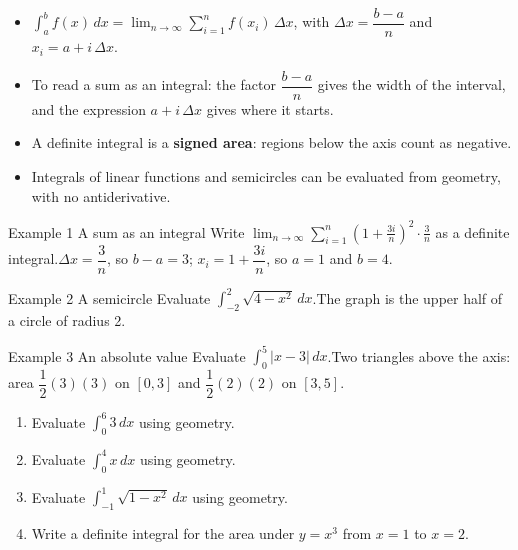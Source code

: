 \documentclass[11pt]{article}
\begin{document}

\begin{ideabox}
\begin{itemize}[leftmargin=*,itemsep=2pt,topsep=2pt]
  \item $\displaystyle\int_{a}^{b}f(x)\,dx=\displaystyle\lim_{n\to\infty}\sum_{i=1}^{n}f(x_i)\,\Delta x$, with $\Delta x=\dfrac{b-a}{n}$ and $x_i=a+i\,\Delta x$.
  \item To read a sum as an integral: the factor $\dfrac{b-a}{n}$ gives the width of the interval, and the expression $a+i\,\Delta x$ gives where it starts.
  \item A definite integral is a \textbf{signed area}: regions below the axis count as negative.
  \item Integrals of linear functions and semicircles can be evaluated from geometry, with no antiderivative.
\end{itemize}
\end{ideabox}

\begin{example}{Example 1 \textperiodcentered{} A sum as an integral}
Write $\displaystyle\lim_{n\to\infty}\sum_{i=1}^{n}\left(1+\frac{3i}{n}\right)^2\cdot\frac{3}{n}$ as a definite integral.\soln $\Delta x=\dfrac3n$, so $b-a=3$; $x_i=1+\dfrac{3i}{n}$, so $a=1$ and $b=4$.
\end{example}

\begin{example}{Example 2 \textperiodcentered{} A semicircle}
Evaluate $\displaystyle\int_{-2}^{2}\sqrt{4-x^2}\,dx$.\soln The graph is the upper half of a circle of radius 2.
\end{example}

\begin{example}{Example 3 \textperiodcentered{} An absolute value}
Evaluate $\displaystyle\int_{0}^{5}|x-3|\,dx$.\soln Two triangles above the axis: area $\dfrac12(3)(3)$ on $[0,3]$ and $\dfrac12(2)(2)$ on $[3,5]$.
\end{example}

\newpage
{}

\begin{enumerate}[leftmargin=*,itemsep=2pt]
  \item Evaluate $\displaystyle\int_{0}^{6}3\,dx$ using geometry.\work{2.3cm}
  \item Evaluate $\displaystyle\int_{0}^{4}x\,dx$ using geometry.\work{2.3cm}
  \item Evaluate $\displaystyle\int_{-1}^{1}\sqrt{1-x^2}\,dx$ using geometry.\work{2.3cm}
  \item Write a definite integral for the area under $y=x^3$ from $x=1$ to $x=2$.\work{2.3cm}
\end{enumerate}
\end{document}
